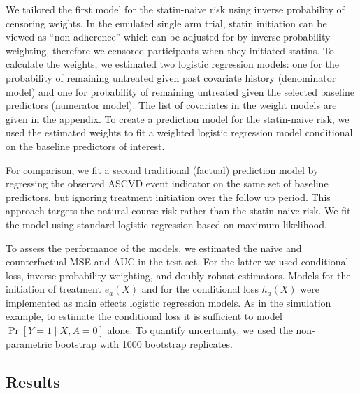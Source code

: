 We tailored the first model for the statin-naive risk using inverse probability of censoring weights. In the emulated single arm trial, statin initiation can be viewed as ``non-adherence'' which can be adjusted for by inverse probability weighting, therefore we censored participants when they initiated statins. To calculate the weights, we estimated two logistic regression models: one for the probability of remaining untreated given past covariate history (denominator model) and one for probability of remaining untreated given the selected baseline predictors (numerator model). The list of covariates in the weight models are given in the appendix. To create a prediction model for the statin-naive risk, we used the estimated weights to fit a weighted logistic regression model conditional on the baseline predictors of interest. 

For comparison, we fit a second traditional (factual) prediction model by regressing the observed ASCVD event indicator on the same set of baseline predictors, but ignoring treatment initiation over the follow up period. This approach targets the natural course risk rather than the statin-naive risk. We fit the model using standard logistic regression based on maximum likelihood.

To assess the performance of the models, we estimated the naive and counterfactual MSE and AUC in the test set. For the latter we used conditional loss, inverse probability weighting, and doubly robust estimators. Models for the initiation of treatment $e_a(X)$ and for the conditional loss $h_a(X)$ were implemented as main effects logistic regression models. As in the simulation example, to estimate the conditional loss it is sufficient to model $\operatorname{Pr}[Y=1 \mid X, A=0]$ alone. To quantify uncertainty, we used the non-parametric bootstrap with 1000 bootstrap replicates.

\subsection{Results}


